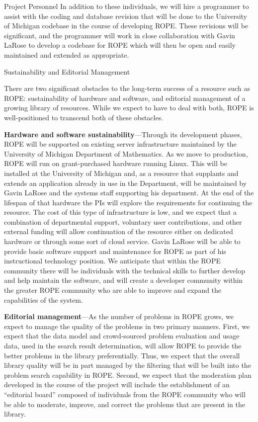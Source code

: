 \documentclass[11pt]{article}
\begin{document}
\begin{section}{Project Personnel}
In addition to these individuals, we will hire a programmer to assist with
the coding and database revision that will be done to the University of
Michigan codebase in the course of developing ROPE. These revisions
will be significant, and the programmer will work in close collaboration
with Gavin LaRose to develop a codebase for ROPE which will then be
open and easily maintained and extended as appropriate. 

\end{section}

\begin{section}{Sustainability and Editorial Management}

There are two significant obstacles to the long-term success of a resource
such as ROPE: sustainability of hardware and software, and editorial
management of a growing library of resources.  While we expect to have to
deal with both, ROPE is well-positioned to transcend both of these
obstacles.

\textbf{Hardware and software sustainability}---Through its development
phases, ROPE will be supported on existing server infrastructure
maintained by the University of Michigan Department of Mathematics.  As we
move to production, ROPE will run on grant-purchased hardware running
Linux.  This will be installed at the University of Michigan and, as a
resource that supplants and extends an application already in use in the
Department, will be maintained by Gavin LaRose and the systems staff
supporting his department.  At the end of the lifespan of that hardware
the PIs will explore the requirements for continuing the resource.  The
cost of this type of infrastructure is low, and we expect that a
combination of departmental support, voluntary user contributions, and
other external funding will allow continuation of the resource either on
dedicated hardware or through some sort of cloud service.  Gavin LaRose
will be able to provide basic software support and maintenance for ROPE as
part of his instructional technology position.  We anticipate that within
the ROPE community there will be individuals with the technical skills to
further develop and help maintain the software, and will create a
developer community within the greater ROPE community who are able to
improve and expand the capabilities of the system.

\textbf{Editorial management}---As the number of problems in ROPE grows,
we expect to manage the quality of the problems in two primary manners.
First, we expect that the data model and crowd-sourced problem evaluation
and usage data, used in the search result determination, will allow ROPE
to provide the better problems in the library preferentially.  Thus, we
expect that the overall library quality will be in part managed by the
filtering that will be built into the problem search capability in ROPE.
Second, we expect that the moderation plan developed in the course of the
project will include the establishment of an ``editorial board'' composed
of individuals from the ROPE community who will be able to moderate,
improve, and correct the problems that are present in the library.

\end{section}
\end{document}
